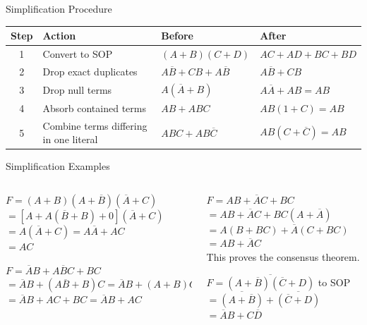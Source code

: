 \documentclass[9pt,aspectratio=169,xcolor=table]{beamer}
\newcommand{\striped}{\rowcolors{1}{white}{stripe}}
\begin{document}
\begin{frame}{Simplification Procedure}
  \centering\striped
  \begin{tabular}{@{}cR{.2\textwidth}ll@{}}
    \toprule
    \textbf{Step} & \textbf{Action} & \textbf{Before} & \textbf{After} \\
     & Convert to SOP & $(A+B)(C+D)$ & $AC+AD+BC+BD$ \\
    2 & Drop exact duplicates & $A\overline{B}+CB+A\overline{B}$ & $A\overline{B}+CB$ \\
    3 & Drop null terms & $A(\overline{A}+B)$ & $A\overline{A}+AB = AB$ \\
    4 & Absorb contained terms & $AB+ABC$ & $AB(1+C) = AB$ \\
    5 & Combine terms differing in one literal & $ABC+AB\overline{C}$ & $AB(C+\overline{C}) = AB$ \\
    \bottomrule
  \end{tabular}
\end{frame}

\begin{frame}{Simplification Examples}
  \begin{columns}[t]
  \begin{column}{.5\textwidth}
    \begin{block}{$F = (A+B)(A+\overline{B})(\overline{A}+C)$}
      \scriptsize
      $= [A + A(\overline{B}+B) + 0](\overline{A}+C)$\\
      $= A(\overline{A}+C) = A\overline{A} + AC$\\
      $= AC$
    \end{block}
    \begin{block}{$F = \overline{A}B + A\overline{B}C + BC$}
      \scriptsize
      $= \overline{A}B + (A\overline{B}+B)C = \overline{A}B + (A+B)C$\\
      $= \overline{A}B + AC + BC = \overline{A}B + AC$
    \end{block}
  \end{column}
  \begin{column}{.48\textwidth}
    \begin{block}{$F = AB + \overline{A}C + BC$}
      \scriptsize
      $= AB + \overline{A}C + BC(A+\overline{A})$\\
      $= A(B+BC) + \overline{A}(C+BC)$\\
      $= AB + \overline{A}C$\\
      This proves the consensus theorem.
    \end{block}
    \begin{block}{$F = \overline{(A+\overline{B})(\overline{C}+D)}$ to SOP}
      \scriptsize
      $= \overline{(A+\overline{B})} + \overline{(\overline{C}+D)}$\\
      $= \overline{A}B + C\overline{D}$
    \end{block}
  \end{column}
  \end{columns}
\end{frame}
\end{document}

